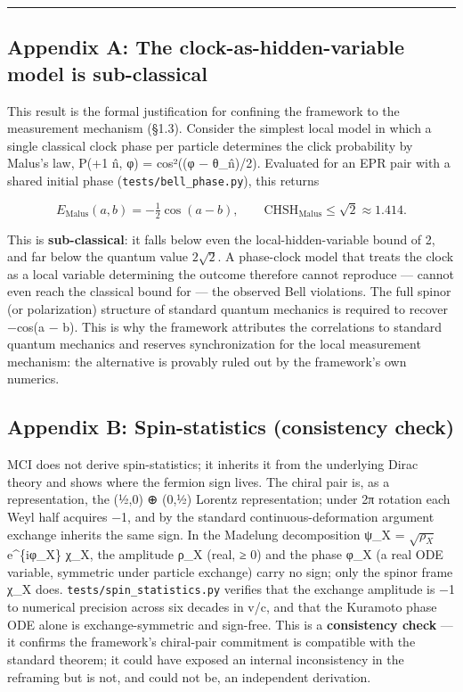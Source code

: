 \documentclass[
]{article}
\begin{document}
\begin{center}\rule{0.5\linewidth}{0.5pt}\end{center}

\subsection{Appendix A: The clock-as-hidden-variable model is
sub-classical}\label{appendix-a-the-clock-as-hidden-variable-model-is-sub-classical}

This result is the formal justification for confining the framework to
the measurement mechanism (§1.3). Consider the simplest local model in
which a single classical clock phase per particle determines the click
probability by Malus's law, P(+1 \textbar{} n̂, φ) = cos²((φ − θ\_n̂)/2).
Evaluated for an EPR pair with a shared initial phase
(\texttt{tests/bell\_phase.py}), this returns

\[E_{\text{Malus}}(a, b) = -\tfrac{1}{2}\cos(a - b), \qquad \text{CHSH}_{\text{Malus}} \leq \sqrt{2} \approx 1.414.\]

This is \textbf{sub-classical}: it falls below even the
local-hidden-variable bound of 2, and far below the quantum value
\(2\sqrt{2}\). A phase-clock model that treats the clock as a local
variable determining the outcome therefore cannot reproduce --- cannot
even reach the classical bound for --- the observed Bell violations. The
full spinor (or polarization) structure of standard quantum mechanics is
required to recover −cos(a − b). This is why the framework attributes
the correlations to standard quantum mechanics and reserves
synchronization for the local measurement mechanism: the alternative is
provably ruled out by the framework's own numerics.

\subsection{Appendix B: Spin-statistics (consistency
check)}\label{appendix-b-spin-statistics-consistency-check}

MCI does not derive spin-statistics; it inherits it from the underlying
Dirac theory and shows where the fermion sign lives. The chiral pair is,
as a representation, the (½,0) ⊕ (0,½) Lorentz representation; under 2π
rotation each Weyl half acquires −1, and by the standard
continuous-deformation argument exchange inherits the same sign. In the
Madelung decomposition ψ\_X = \(\sqrt{\rho_X}\) e\^{}\{iφ\_X\} χ\_X, the
amplitude ρ\_X (real, ≥ 0) and the phase φ\_X (a real ODE variable,
symmetric under particle exchange) carry no sign; only the spinor frame
χ\_X does. \texttt{tests/spin\_statistics.py} verifies that the exchange
amplitude is −1 to numerical precision across six decades in v/c, and
that the Kuramoto phase ODE alone is exchange-symmetric and sign-free.
This is a \textbf{consistency check} --- it confirms the framework's
chiral-pair commitment is compatible with the standard theorem; it could
have exposed an internal inconsistency in the reframing but is not, and
could not be, an independent derivation.
\end{document}
